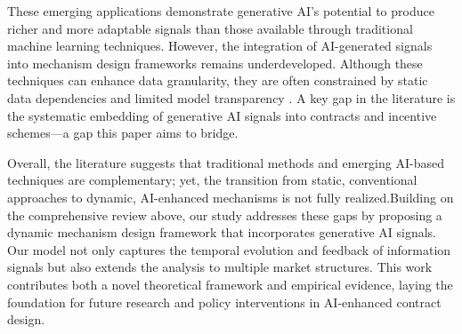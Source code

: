 These emerging applications demonstrate generative AI's potential to produce richer and more adaptable signals than those available through traditional machine learning techniques. However, the integration of AI-generated signals into mechanism design frameworks remains underdeveloped. Although these techniques can enhance data granularity, they are often constrained by static data dependencies and limited model transparency \citep{rudin2019stop, varian2014big, athey2019machine}. A key gap in the literature is the systematic embedding of generative AI signals into contracts and incentive schemes—a gap this paper aims to bridge.

Overall, the literature suggests that traditional methods and emerging AI-based techniques are complementary; yet, the transition from static, conventional approaches to dynamic, AI-enhanced mechanisms is not fully realized.Building on the comprehensive review above, our study addresses these gaps by proposing a dynamic mechanism design framework that incorporates generative AI signals. Our model not only captures the temporal evolution and feedback of information signals but also extends the analysis to multiple market structures. This work contributes both a novel theoretical framework and empirical evidence, laying the foundation for future research and policy interventions in AI-enhanced contract design.